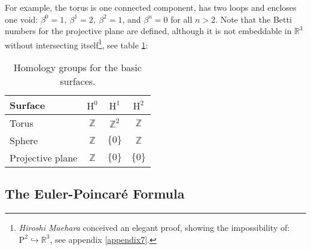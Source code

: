 For example, the torus is one connected component, has two loops and encloses one void: $\beta^{0} = 1, ~\beta^{1} = 2, ~\beta^{2} = 1$, and $\beta^{n} = 0$ for all $n > 2$.
Note that the Betti numbers for the projective plane are defined, although it is not embeddable in $\mathbb{R}^{3}$ without intersecting itself\footnote{ \textit{Hiroshi Maehara} conceived an elegant proof, showing the impossibility of: $\mathrm{P}^{2} \hookrightarrow \mathbb{R}^{3}$, see appendix \ref{appendix7}.}, see table \ref{tab:betti_numbers}:
\begin{table}[hbt]
\medskip
\setlength{\tabcolsep}{15pt}
\renewcommand{\arraystretch}{1.15}
   \centering
\begin{tabular}{ l | c c c} \centering
	\textbf{Surface}	& $\mathrm{H}^{0}$	& $\mathrm{H}^{1}$	& $\mathrm{H}^{2}$ \\ \hline
	Torus			& $\mathbb{Z}$		& $\mathbb{Z}^{2}$	& $\mathbb{Z}$ \\
	Sphere			& $\mathbb{Z}$		& $\{0\}$				& $\mathbb{Z}$ \\
	Projective plane	& $\mathbb{Z}$		& $\{0\}$				& $\{0\}$
\end{tabular}
	\medskip
	\caption{Homology groups for the basic surfaces.}
	\label{tab:betti_numbers} 
\end{table}

\subsection{The Euler-Poincaré Formula}
\label{math_euler_{poincare}}

